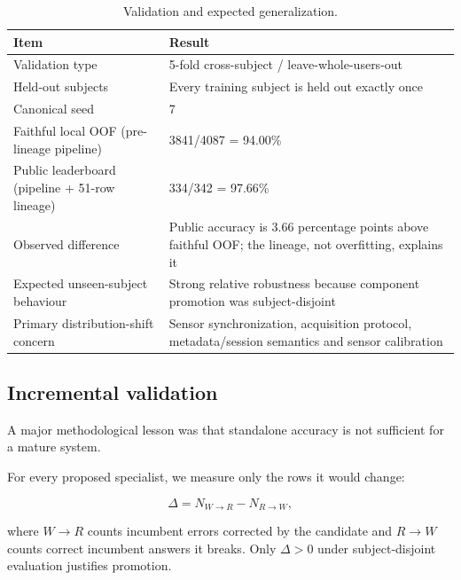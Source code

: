 \documentclass[12pt,a4paper]{article}
\begin{document}
\begin{table}[ht]
\centering
\small
\begin{tabularx}{\textwidth}{p{5.1cm}X}
\toprule
\textbf{Item} & \textbf{Result} \\
\midrule

Validation type &
5-fold cross-subject / leave-whole-users-out \\

Held-out subjects &
Every training subject is held out exactly once \\

Canonical seed &
7 \\

Faithful local OOF (pre-lineage pipeline) &
3841/4087 = 94.00\% \\

Public leaderboard (pipeline + 51-row lineage) &
334/342 = 97.66\% \\

Observed difference &
Public accuracy is 3.66 percentage points above faithful OOF;
the lineage, not overfitting, explains it \\

Expected unseen-subject behaviour &
Strong relative robustness because component promotion was subject-disjoint \\

Primary distribution-shift concern &
Sensor synchronization, acquisition protocol, metadata/session semantics and sensor calibration \\

\bottomrule
\end{tabularx}
\caption{Validation and expected generalization.}
\end{table}

\subsection{Incremental validation}

A major methodological lesson was that standalone accuracy is not sufficient
for a mature system.

For every proposed specialist, we measure only the rows it would change:

\[
\Delta
=
N_{W\rightarrow R}
-
N_{R\rightarrow W},
\]

where \(W\rightarrow R\) counts incumbent errors corrected by the candidate and
\(R\rightarrow W\) counts correct incumbent answers it breaks. Only
\(\Delta > 0\) under subject-disjoint evaluation justifies promotion.
\end{document}
